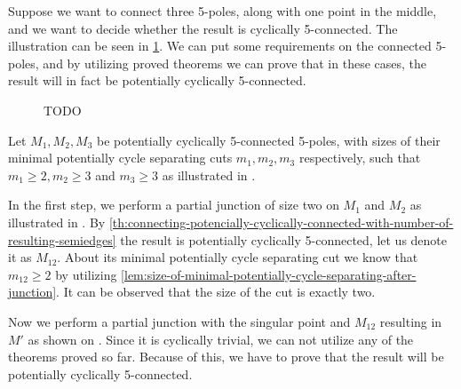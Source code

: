 \documentclass[12pt, twoside]{book}
\begin{document}
\begin{example}
	Suppose we want to connect three 5-poles, along with one point in the middle, and we want to decide whether the result is cyclically 5-connected. The illustration can be seen in \cref{fig:3-5-poles-connected}. We can put some requirements on the connected 5-poles, and by utilizing proved theorems we can prove that in these cases, the result will in fact be potentially cyclically 5-connected.
	
	\begin{figure}
		\centering
		\caption{TODO}
		\label{fig:3-5-poles-connected}
	\end{figure}
	
	Let $M_1,M_2,M_3$ be potentially cyclically 5-connected 5-poles, with sizes of their minimal potentially cycle separating cuts $m_1,m_2,m_3$ respectively, such that $m_1\geq 2,m_2\geq 3$ and $m_3\geq 3$ as illustrated in .
	
	In the first step, we perform a partial junction of size two on $M_1$ and $M_2$ as illustrated in . By \cref{th:connecting-potencially-cyclically-connected-with-number-of-resulting-semiedges} the result is potentially cyclically 5-connected, let us denote it as $M_{12}$. About its minimal potentially cycle separating cut we know that $m_{12}\geq 2$ by utilizing \cref{lem:size-of-minimal-potentially-cycle-separating-after-junction}. It can be observed that the size of the cut is exactly two.
	
	Now we perform a partial junction with the singular point and $M_{12}$ resulting in $M'$ as shown on . Since it is cyclically trivial, we can not utilize any of the theorems proved so far. Because of this, we have to prove that the result will be potentially cyclically 5-connected.
	

\end{example}
\end{document}
